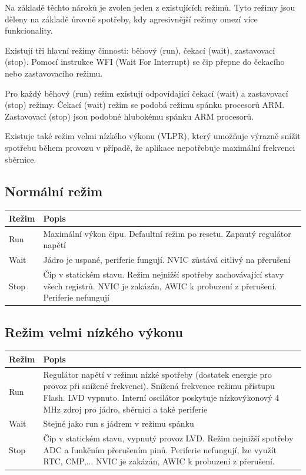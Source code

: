 \documentclass{article}
\begin{document}
Na základě těchto nároků je zvolen jeden z existujících režimů. Tyto režimy
jsou děleny na základě ůrovně spotřeby, kdy agresivnější režimy omezí více
funkcionality.

Existují tři hlavní režimy činnosti: běhový (run), čekací (wait), zastavovací
(stop). Pomocí instrukce WFI (Wait For Interrupt) se čip přepne do čekacího
nebo zastavovacího režimu.

Pro každý běhový (run) režim existují odpovídající čekací (wait) a zastavovací
(stop) režimy. Čekací (wait) režim se podobá režimu spánku procesorů ARM.
Zastavovací (stop) jsou podobné hlubokému spánku ARM procesorů.

Existuje také režim velmi nízkého výkonu (VLPR), který umožňuje výrazně snížit
spotřebu během provozu v případě, že aplikace nepotřebuje maximální frekvenci
sběrnice.

\subsection{Normální režim}

\begin{tabularx}{\textwidth}{|>{\centering\arraybackslash}p{}|X|}
    \hline
    \textbf{Režim} & \textbf{Popis} \\
    \hline
    Run & Maximální výkon čipu. Defaultní režim po resetu. Zapnutý regulátor
    napětí \\
    \hline
    Wait & Jádro je uspané, periferie fungují. NVIC zůstává citlivý na
    přerušení \\
    \hline
    Stop & Čip v statickém stavu. Režim nejnižší spotřeby zachovávající stavy
    všech registrů. NVIC je zakázán, AWIC k probuzení z přerušení. Periferie
    nefungují \\
    \hline
\end{tabularx}

\subsection{Režim velmi nízkého výkonu}

\begin{tabularx}{\textwidth}{|>{\centering\arraybackslash}p{}|X|}
    \hline
    \textbf{Režim} & \textbf{Popis} \\
    \hline
    Run & Regulátor napětí v režimu nízké spotřeby (dostatek energie pro
    provoz při snížené frekvenci). Snížená frekvence režimu přístupu Flash.
    LVD vypnuto. Interní oscilátor poskytuje nízkovýkonový 4 MHz zdroj pro
    jádro, sběrnici a také periferie \\
    \hline
    Wait & Stejné jako run s jádrem v režimu spánku \\
    \hline
    Stop & Čip v statickém stavu, vypnutý provoz LVD. Režim nejnižší spotřeby
    ADC a funkčním přerušením pinů. Periferie nefungují, lze využít RTC,
    CMP,... NVIC je zakázán, AWIC k probuzení z přerušení. \\
    \hline
\end{tabularx}
\end{document}
